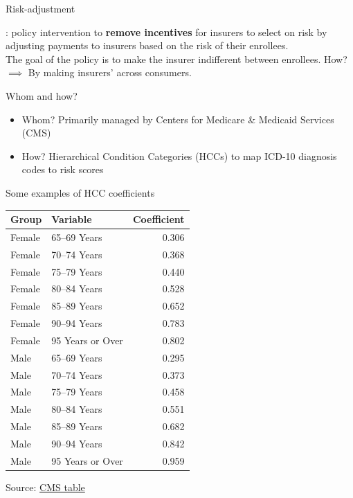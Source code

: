 \begin{frame}{Risk-adjustment}

    : policy intervention to \textbf{remove incentives} for insurers to select on risk by adjusting payments to insurers based on the risk of their enrollees.\\
    The goal of the policy is to make the insurer indifferent between enrollees. How?\\
    $\implies$ By making insurers'  across consumers.\\
    \vspace{3mm}

    Whom and how?
    \begin{itemize}
        \item Whom? Primarily managed by Centers for Medicare \& Medicaid Services (CMS)
        \item How? Hierarchical Condition Categories (HCCs) to map ICD-10 diagnosis codes to risk scores
    \end{itemize}

\end{frame}
\begin{frame}{Some examples of HCC coefficients }

    {\scriptsize
\begin{table}[htbp]
\centering
\begin{tabular}{llr}
\toprule
Group & Variable & Coefficient \\
\midrule
Female & 65--69 Years & 0.306 \\
Female & 70--74 Years & 0.368 \\
Female & 75--79 Years & 0.440 \\
Female & 80--84 Years & 0.528 \\
Female & 85--89 Years & 0.652 \\
Female & 90--94 Years & 0.783 \\
Female & 95 Years or Over & 0.802 \\
\midrule
Male & 65--69 Years & 0.295 \\
Male & 70--74 Years & 0.373 \\
Male & 75--79 Years & 0.458 \\
Male & 80--84 Years & 0.551 \\
Male & 85--89 Years & 0.682 \\
Male & 90--94 Years & 0.842 \\
Male & 95 Years or Over & 0.959 \\
\bottomrule
\end{tabular}
\end{table}
    }

    Source: \href{https://www.cms.gov/files/document/revised-cms-hcc-model-relative-factor-tablespdf}{CMS table}

\end{frame}
